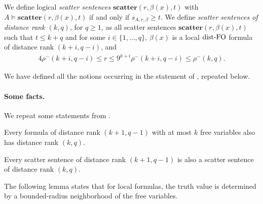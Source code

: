 We define logical \emph{scatter sentences}
\(\textbf{scatter}(r,\beta(x),t)\) with \(A \models \textbf{scatter}(r,\beta(x),t)\) if and only if $s_{A,r,\beta}\ge t$.
We define \emph{scatter sentences of distance rank \((k,q)\)}, for \(q\ge 1\),
as all scatter sentences \(\mathbf{scatter}(r,\beta(x),t)\) such that
\(t\le k+q\) and
for some \(i\in\{1,\ldots,q\}\),
\(\beta(x)\) is a local \(\textrm{\upshape dist-FO}\) formula of distance rank \((k+i,q-i)\), and 
\begin{align}\label{eq:scatter-radius}
4\rho^-(k+i,q-i)\le r\le 9^{k+i}\rho^-(k+i,q-i)\le \rho^-(k,q).
\end{align}

We have defined all the notions occurring in the statement of , repeated below.
\localglobalgame*

\paragraph{Some facts.}
We repeat some statements from \cite{locality-note}.

\begin{observation}\label{obs:preservedistrank}
    Every \distFO formula of distance rank \((k+1,q-1)\) with at most \(k\) free variables also has distance rank \((k,q)\).
\end{observation}

\begin{observation}\label{obs:preservescatterrank}
    Every scatter sentence of distance rank \((k+1,q-1)\) is also a scatter sentence of distance rank \((k,q)\).
\end{observation}

The following lemma states that for local \distFO formulas, the truth value is determined by a bounded-radius neighborhood of the free variables. 


